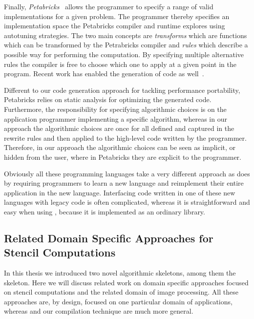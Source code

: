 \bigskip

Finally, \emph{Petabricks}~\cite{AnselCWOZEA09} allows the programmer to specify a range of valid implementations for a given problem.
The programmer thereby specifies an implementation space the Petabricks compiler and runtime explores using autotuning strategies.
The two main concepts are \emph{transforms} which are functions which can be transformed by the Petrabricks compiler and \emph{rules} which describe a possible way for performing the computation.
By specifying multiple alternative rules the compiler is free to choose which one to apply at a given point in the program.
Recent work has enabled the generation of \GPU code as well~\cite{PhothilimthanaARA13}.

Different to our code generation approach for tackling performance portability, Petabricks relies on static analysis for optimizing the generated code.
Furthermore, the responsibility for specifying algorithmic choices is on the application programmer implementing a specific algorithm, whereas in our approach the algorithmic choices are once for all defined and captured in the rewrite rules and then applied to the high-level code written by the programmer.
Therefore, in our approach the algorithmic choices can be seen as implicit, or hidden from the user, where in Petabricks they are explicit to the programmer.

\bigskip
Obviously all these programming languages take a very different approach as \SkelCL does by requiring programmers to learn a new language and reimplement their entire application in the new language.
Interfacing code written in one of these new languages with legacy code is often complicated, whereas it is straightforward and easy when using \SkelCL, because it is implemented as an ordinary \Cpp library.

\subsection[Related Domain Specific Approaches for\\ Stencil Computations]{Related Domain Specific Approaches for Stencil Computations}
In this thesis we introduced two novel algorithmic skeletons, among them the \stencil skeleton.
Here we will discuss related work on domain specific approaches focused on stencil computations and the related domain of image processing.
All these approaches are, by design, focused on one particular domain of applications, whereas \SkelCL and our compilation technique are much more general.

